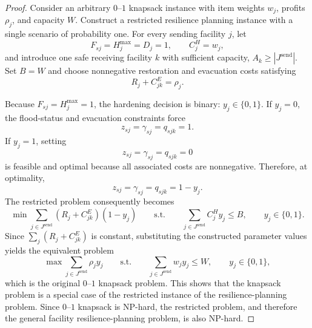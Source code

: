 \documentclass[10pt,a4paper]{amsart}
\begin{document}
\begin{proof}
Consider an arbitrary \(0\)--\(1\) knapsack instance with item weights \(w_j\),
profits \(\rho_j\), and capacity \(W\). Construct a restricted resilience
planning instance with a single scenario of probability one. For every sending
facility \(j\), let
\[
F_{sj}=H_j^{\max}=D_j=1,\qquad
C_j^H=w_j,
\]
and introduce one safe receiving facility \(k\) with sufficient capacity,
\(A_k\ge |J^{\mathrm{send}}|\). Set \(B=W\) and choose nonnegative restoration
and evacuation costs satisfying
\[
R_j+C_{jk}^E=\rho_j.
\]

Because \(F_{sj}=H_j^{\max}=1\), the hardening decision is binary:
\(y_j\in\{0,1\}\). If \(y_j=0\), the flood-status and evacuation constraints
force
\[
z_{sj}=\gamma_{sj}=q_{sjk}=1.
\]
If \(y_j=1\), setting
\[
z_{sj}=\gamma_{sj}=q_{sjk}=0
\]
is feasible and optimal because all associated costs are nonnegative.
Therefore, at optimality,
\[
z_{sj}=\gamma_{sj}=q_{sjk}=1-y_j.
\]
The restricted problem consequently becomes
\[
\min \sum_{j\in J^{\mathrm{send}}}
(R_j+C_{jk}^E)(1-y_j)
\qquad
\text{s.t.}
\qquad
\sum_{j\in J^{\mathrm{send}}} C_j^H y_j\le B,
\qquad
y_j\in\{0,1\}.
\]
Since \(\sum_j(R_j+C_{jk}^E)\) is constant, substituting the constructed
parameter values yields the equivalent problem
\[
\max \sum_{j\in J^{\mathrm{send}}}\rho_j y_j
\qquad
\text{s.t.}
\qquad
\sum_{j\in J^{\mathrm{send}}}w_j y_j\le W,
\qquad
y_j\in\{0,1\},
\]
which is the original \(0\)--\(1\) knapsack problem. This shows that the knapsack problem is a special case of the restricted instance of the resilience-planning problem. Since \(0\)--\(1\) knapsack is NP-hard, the restricted problem, and therefore the general facility resilience-planning problem, is also NP-hard.
\end{proof}
\end{document}

